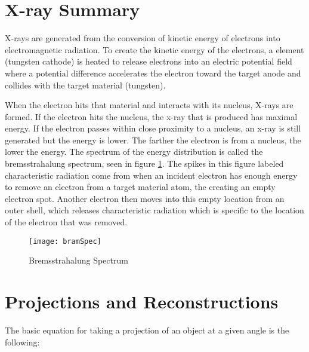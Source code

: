 \section{X-ray Summary}

X-rays are generated from the conversion of kinetic energy of electrons into electromagnetic radiation. To create the kinetic energy of the electrons, a element (tungsten cathode) is heated to release electrons into an electric potential field where a potential difference accelerates the electron toward the target anode and collides with the target material (tungsten).

When the electron hits that material and interacts with its nucleus, X-rays are formed. If the electron hits the nucleus, the x-ray that is produced has maximal energy. If the electron passes within close proximity to a nucleus, an x-ray is still generated but the energy is lower.  The farther the electron is from a nucleus, the lower the energy.  The spectrum of the energy distribution is called the bremsstrahalung spectrum, seen in figure \ref{fig:ct:brem}.  The spikes in this figure labeled characteristic radiation come from when an incident electron has enough energy to remove an electron from a target material atom, the creating an empty electron spot.  Another electron then moves into this empty location from an outer shell, which releases characteristic radiation which is specific to the location of the electron that was removed. 

\begin{figure}[h]
	\centering
	\texttt{[image: bramSpec]}
	\caption{Bremsstrahalung Spectrum}
	\label{fig:ct:brem}
\end{figure}

\section{Projections and Reconstructions}

The basic equation for taking a projection of an object at a given angle is the following:

